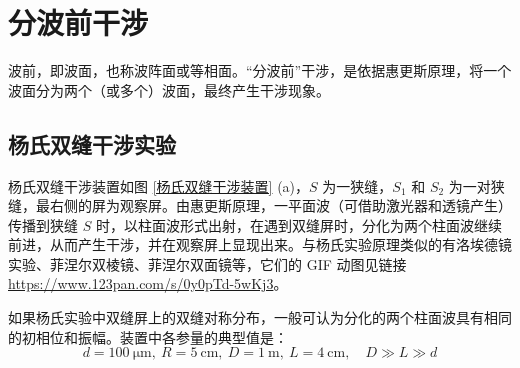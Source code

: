 \documentclass[UTF8]{report}
\theoremstyle{MyLineTheoremStyle} %
\theoremstyle{MyBlockTheoremStyle} %
\theoremstyle{MySubsubsectionStyle} %
\begin{document}



\section{分波前干涉}

波前，即波面，也称波阵面或等相面。“分波前”干涉，是依据惠更斯原理，将一个波面分为两个（或多个）波面，最终产生干涉现象。

\subsection{杨氏双缝干涉实验}

杨氏双缝干涉装置如图 \ref{杨氏双缝干涉装置} (a)，$S$ 为一狭缝，$S_1$ 和 $S_2$ 为一对狭缝，最右侧的屏为观察屏。由惠更斯原理，一平面波（可借助激光器和透镜产生）传播到狭缝 $S$ 时，以柱面波形式出射，在遇到双缝屏时，分化为两个柱面波继续前进，从而产生干涉，并在观察屏上显现出来。与杨氏实验原理类似的有洛埃德镜实验、菲涅尔双棱镜、菲涅尔双面镜等，它们的 GIF 动图见链接 \href{https://www.123pan.com/s/0y0pTd-5wKj3}{https://www.123pan.com/s/0y0pTd-5wKj3}。

如果杨氏实验中双缝屏上的双缝对称分布，一般可认为分化的两个柱面波具有相同的初相位和振幅。装置中各参量的典型值是：
\begin{equation}
d = 100 \ \mathrm{\mu m},\  R = 5\ \mathrm{cm},\ D = 1\ \mathrm{m},\ L = 4 \ \mathrm{cm},\quad D \gg L \gg d
\end{equation}
\end{document}

